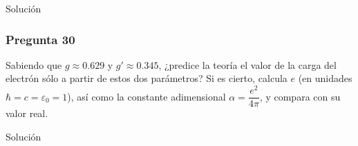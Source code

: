 Solución

\vspace*{2em}

\begin{Enunciado}
	\subsubsection*{Pregunta 30}

	Sabiendo que $g \approx 0.629$ y $g' \approx 0.345$, ¿predice la teoría el valor de la carga del electrón sólo a partir de estos dos parámetros? Si es cierto, calcula $e$ (en unidades $\hbar = c = \varepsilon_0 = 1$), así como la constante adimensional $\alpha = \dfrac{e^2}{4\pi}$, y compara con su valor real.

\end{Enunciado}

Solución

\vspace*{2em}
